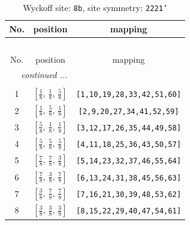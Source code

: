 \documentclass[fleqn,8pt]{jsarticle}
\begin{document}
\begin{longtable}{ccc}
\caption{Wyckoff site: {\tt 8b}, site symmetry: {\tt 2221'}}
 \\
 \hline \hline
No. & position & mapping \\ \hline \endfirsthead

\multicolumn{2}{l}{\tablename\ \thetable{}} \\
 \hline \hline
No. & position & mapping \\ \hline \endhead

 \hline \hline
\multicolumn{2}{r}{\footnotesize\it continued ...} \\ \endfoot

 \hline \hline
\multicolumn{2}{r}{} \\ \endlastfoot

1 & $\left[ \frac{1}{8},\, \frac{1}{8},\, \frac{5}{8} \right]$ & {\tt [1,10,19,28,33,42,51,60]} \\ \hline
2 & $\left[ \frac{1}{8},\, \frac{5}{8},\, \frac{1}{8} \right]$ & {\tt [2,9,20,27,34,41,52,59]} \\ \hline
3 & $\left[ \frac{5}{8},\, \frac{1}{8},\, \frac{1}{8} \right]$ & {\tt [3,12,17,26,35,44,49,58]} \\ \hline
4 & $\left[ \frac{5}{8},\, \frac{5}{8},\, \frac{5}{8} \right]$ & {\tt [4,11,18,25,36,43,50,57]} \\ \hline
5 & $\left[ \frac{7}{8},\, \frac{7}{8},\, \frac{3}{8} \right]$ & {\tt [5,14,23,32,37,46,55,64]} \\ \hline
6 & $\left[ \frac{7}{8},\, \frac{3}{8},\, \frac{7}{8} \right]$ & {\tt [6,13,24,31,38,45,56,63]} \\ \hline
7 & $\left[ \frac{3}{8},\, \frac{7}{8},\, \frac{7}{8} \right]$ & {\tt [7,16,21,30,39,48,53,62]} \\ \hline
8 & $\left[ \frac{3}{8},\, \frac{3}{8},\, \frac{3}{8} \right]$ & {\tt [8,15,22,29,40,47,54,61]} \\
\end{longtable}
\renewcommand{\arraystretch}{1.2}
\end{document}
